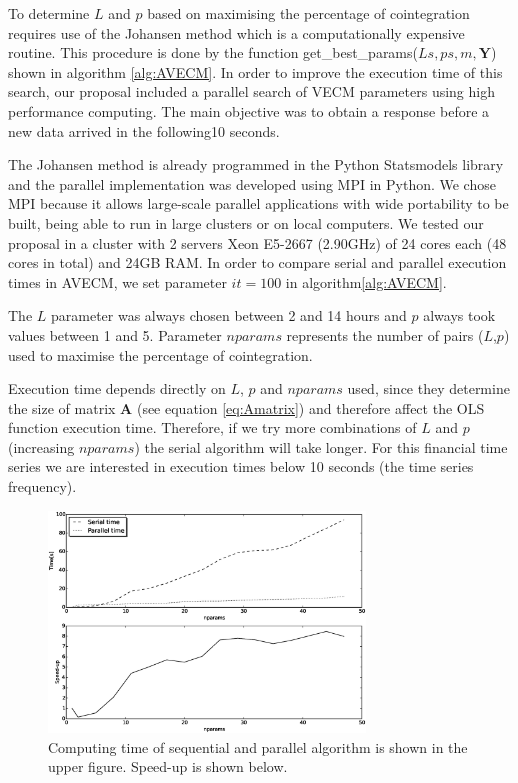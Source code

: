 To determine $L$ and $p$ based on maximising the percentage of cointegration
requires use of the Johansen method which is a computationally expensive
routine. This procedure is done by the function
get\_best\_params($Ls,ps,m,\mathbf{Y}$) shown in algorithm \ref{alg:AVECM}.  In
order to improve the execution time of this search, our proposal included a
parallel search of VECM parameters using high performance computing.  The main
objective was to obtain a response before a new data arrived in the following10
seconds.

The Johansen method is already programmed in the Python Statsmodels
library \citep{seabold2010} and the parallel implementation was developed using
MPI in Python.  We chose MPI because it allows large-scale parallel applications
with wide portability to be built, being able to run in large clusters or on
local computers.  We tested our proposal in a cluster with 2 servers Xeon
E5-2667 (2.90GHz) of 24 cores each (48 cores in total) and 24GB RAM.  In order
to compare serial and parallel execution times in AVECM, we set parameter
$it=100$ in algorithm\ref{alg:AVECM}.

The $L$ parameter was always chosen between 2 and 14 hours and $p$ always took
values between 1 and 5. Parameter $nparams$ represents the number of pairs
($L$,$p$) used to maximise the percentage of cointegration. 

Execution time depends directly on $L$, $p$ and $nparams$ used, since they
determine the size of matrix $\mathbf{A}$ (see equation \ref{eq:Amatrix}) and
therefore affect the OLS function execution time.  Therefore, if we try more
combinations of $L$ and $p$ (increasing $nparams$) the serial algorithm will
take longer. For this financial time series we are interested in execution times
below 10 seconds  (the time series frequency).

\begin{figure}[ht]
  \centering
  \includegraphics[width=0.75\textwidth]{img/Fig3}
  \caption{Computing time of sequential and parallel algorithm is shown in the
  upper figure. Speed-up is shown below.}
  \label{fig:extimes}
\end{figure}

